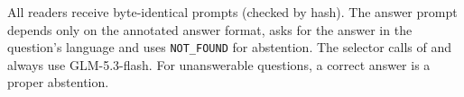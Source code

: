 All readers receive byte-identical prompts (checked by hash). The answer prompt depends only on the annotated answer format, asks for the answer in the question's language and uses \texttt{NOT\_FOUND} for abstention. The selector calls of \lexb{} and \setr{} always use GLM-5.3-flash. For unanswerable questions, a correct answer is a proper abstention.
